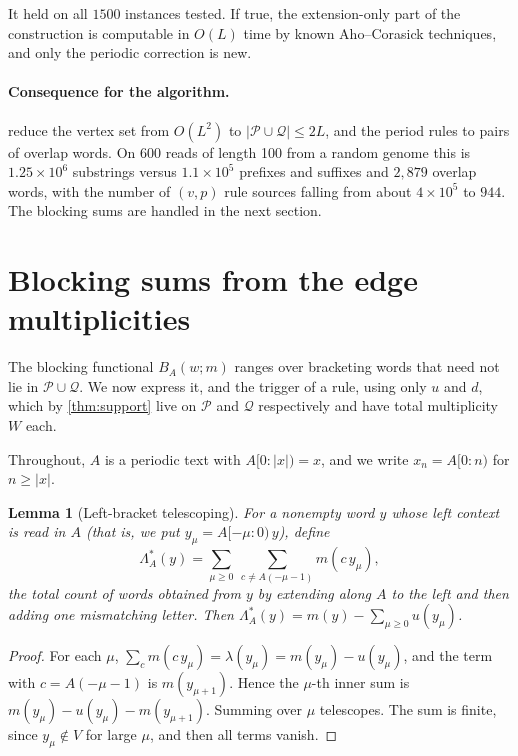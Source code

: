 \documentclass[11pt]{article}
\numberwithin{equation}{section}
\newtheorem{lemma}[theorem]{Lemma}
\theoremstyle{definition}
\newcommand{\len}[1]{\lvert #1\rvert}
\newcommand{\Pre}{\mathcal P}
\newcommand{\Suf}{\mathcal Q}
\begin{document}
It held on all $1500$ instances tested. If true, the extension-only part of
the construction is computable in $O(L)$ time by known Aho--Corasick
techniques, and only the periodic correction is new.

\paragraph{Consequence for the algorithm.}
 reduce the vertex set from $O(L^2)$ to
$\len{\Pre\cup\Suf}\le2L$, and the period rules to pairs of overlap words. On
600 reads of length 100 from a random genome this is $1.25\times10^6$
substrings versus $1.1\times10^5$ prefixes and suffixes and $2{,}879$ overlap
words, with the number of $(v,p)$ rule sources falling from about
$4\times10^5$ to $944$. The blocking sums are handled in the next section.

\section{Blocking sums from the edge multiplicities}\label{sec:blocking}

The blocking functional $B_A(w;m)$ ranges over bracketing words that need not
lie in $\Pre\cup\Suf$. We now express it, and the trigger of a rule, using
only $u$ and $d$, which by \cref{thm:support} live on $\Pre$ and $\Suf$
respectively and have total multiplicity $W$ each.

Throughout, $A$ is a periodic text with $A[0:\len x)=x$, and we write
$x_n=A[0:n)$ for $n\ge\len x$.

\begin{lemma}[Left-bracket telescoping]\label{lem:left-tele}
For a nonempty word $y$ whose left context is read in $A$ (that is, we put
$y_\mu=A[-\mu:0)\,y$), define
\[
\Lambda^*_A(y)=\sum_{\mu\ge0}\ \sum_{c\ne A(-\mu-1)} m(c\,y_\mu),
\]
the total count of words obtained from $y$ by extending along $A$ to the left
and then adding one mismatching letter. Then
$\Lambda^*_A(y)=m(y)-\sum_{\mu\ge0}u(y_\mu)$.
\end{lemma}

\begin{proof}
For each $\mu$, $\sum_c m(c\,y_\mu)=\lambda(y_\mu)=m(y_\mu)-u(y_\mu)$, and the
term with $c=A(-\mu-1)$ is $m(y_{\mu+1})$. Hence the $\mu$-th inner sum is
$m(y_\mu)-u(y_\mu)-m(y_{\mu+1})$. Summing over $\mu$ telescopes. The sum is
finite, since $y_\mu\notin V$ for large $\mu$, and then all terms vanish.
\end{proof}
\end{document}
